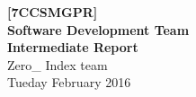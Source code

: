 \begin{titlepage}
    \begin{center}
        \vspace*{6cm}
        \noindent\makebox[\linewidth]{\rule{\paperwidth}{0.4pt}}
        \Huge
        \textbf{[7CCSMGPR]\\Software Development Team\\}
        \vspace{0.5cm}
        \Large
        \textbf{Intermediate Report\\}
        \vspace{1.5cm}
        \large
        \textsf{Zero\_ Index team\\}
        \vspace{1cm}
        \textsf{Tueday  February 2016}
        \noindent\makebox[\linewidth]{\rule{\paperwidth}{0.4pt}}
        \vfill
	\end{center}
	\vspace{1cm}
\end{titlepage}